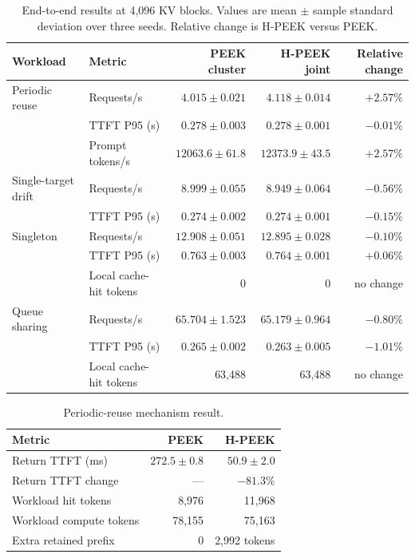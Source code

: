 \documentclass[10pt,twocolumn]{article}
\begin{document}
\begin{table}[t]
  \centering
  \caption{End-to-end results at 4,096 KV blocks. Values are mean $\pm$ sample
  standard deviation over three seeds. Relative change is H-PEEK versus PEEK.}
  \label{tab:main-results}
  \begin{tabular}{llrrr}
    \toprule
    Workload & Metric & PEEK cluster & H-PEEK joint & Relative change \\
    \midrule
    Periodic reuse & Requests/s & $4.015\pm0.021$ & $4.118\pm0.014$ & $+2.57\%$ \\
                   & TTFT P95 (s) & $0.278\pm0.003$ & $0.278\pm0.001$ & $-0.01\%$ \\
                   & Prompt tokens/s & $12063.6\pm61.8$ & $12373.9\pm43.5$ & $+2.57\%$ \\
    \addlinespace
    Single-target drift & Requests/s & $8.999\pm0.055$ & $8.949\pm0.064$ & $-0.56\%$ \\
                        & TTFT P95 (s) & $0.274\pm0.002$ & $0.274\pm0.001$ & $-0.15\%$ \\
    \addlinespace
    Singleton & Requests/s & $12.908\pm0.051$ & $12.895\pm0.028$ & $-0.10\%$ \\
              & TTFT P95 (s) & $0.763\pm0.003$ & $0.764\pm0.001$ & $+0.06\%$ \\
              & Local cache-hit tokens & 0 & 0 & no change \\
    \addlinespace
    Queue sharing & Requests/s & $65.704\pm1.523$ & $65.179\pm0.964$ & $-0.80\%$ \\
                  & TTFT P95 (s) & $0.265\pm0.002$ & $0.263\pm0.005$ & $-1.01\%$ \\
                  & Local cache-hit tokens & 63,488 & 63,488 & no change \\
    \bottomrule
  \end{tabular}
\end{table}

\begin{table}[t]
  \centering
  \caption{Periodic-reuse mechanism result.}
  \label{tab:return}
  \begin{tabular}{lrr}
    \toprule
    Metric & PEEK & H-PEEK \\
    \midrule
    Return TTFT (ms) & $272.5\pm0.8$ & $50.9\pm2.0$ \\
    Return TTFT change & --- & $-81.3\%$ \\
    Workload hit tokens & 8,976 & 11,968 \\
    Workload compute tokens & 78,155 & 75,163 \\
    Extra retained prefix & 0 & 2,992 tokens \\
    \bottomrule
  \end{tabular}
\end{table}
\end{document}
